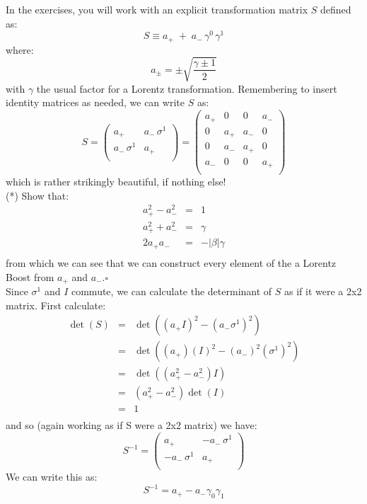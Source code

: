 \documentclass[12pt]{article}
\begin{document}
In the exercises, you will work with an explicit transformation matrix $S$ defined as:
$$S \equiv a_+ \; + \; a_- \, \gamma^0 \, \gamma^1$$
where:
$$a_\pm = \pm \sqrt{\frac{\gamma \pm 1}{2}}$$
with $\gamma$ the usual factor for a Lorentz transformation.
Remembering to insert identity matrices as needed, we can write $S$
as:
$$S = \begin{pmatrix}
a_+ & a_- \, \sigma^1 \\
a_- \, \sigma^1 & a_+ \\
\end{pmatrix}
= \begin{pmatrix}
a_+ & 0 & 0   & a_- \\
0 & a_+ & a_- & 0 \\
0 & a_- & a_+ & 0 \\
a_- & 0 & 0 & a_+ \\
\end{pmatrix}
$$
which is rather strikingly beautiful, if nothing else!  \\[5pt]

\exercise (*) Show that:
\begin{eqnarray*}
a_{+}^2 - a_{-}^2 &=& 1 \\
a_{+}^2 + a_{-}^2 &=& \gamma \\
2 a_{+} a_{-} &=& -|\beta| \gamma \\
\end{eqnarray*}
from which we can see that we can construct every element of the a Lorentz Boost from $a_+$ and $a_-$.$\square$\\[5pt]

Since $\sigma^1$ and $I$ commute, we can calculate the determinant of $S$ as if it were a 2x2 matrix.  First calculate:
\begin{eqnarray*}
  \det(S) &=& \det((a_+ I)^2 - (a_-\sigma^1)^2)\\
  &=& \det((a_+) (I)^2 - (a_-)^2(\sigma^1)^2)\\
  &=& \det((a_+^2 - a_-^2) I)\\
  &=& (a_+^2 - a_-^2) \det(I)\\
  &=& 1\\
\end{eqnarray*}
and so (again working as if S were a 2x2 matrix) we have:
$$S^{-1} = \begin{pmatrix}
a_+ & -a_- \, \sigma^1 \\
-a_- \, \sigma^1 & a_+ \\
\end{pmatrix}
$$
We can write this as:
$$S^{-1} = a_+ - a_- \gamma_0 \gamma_1$$
\end{document}
